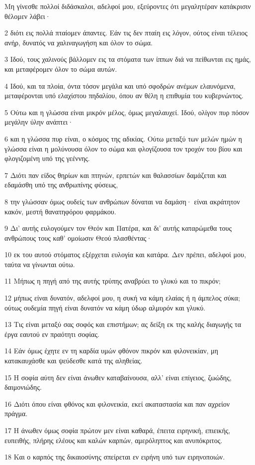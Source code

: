 \par Μη γίνεσθε πολλοί διδάσκαλοι, αδελφοί μου, εξεύροντες ότι μεγαλητέραν κατάκρισιν θέλομεν λάβει·
\par 2 διότι εις πολλά πταίομεν άπαντες. Εάν τις δεν πταίη εις λόγον, ούτος είναι τέλειος ανήρ, δυνατός να χαλιναγωγήση και όλον το σώμα.
\par 3 Ιδού, τους χαλινούς βάλλομεν εις τα στόματα των ίππων διά να πείθωνται εις ημάς, και μεταφέρομεν όλον το σώμα αυτών.
\par 4 Ιδού, και τα πλοία, όντα τόσον μεγάλα και υπό σφοδρών ανέμων ελαυνόμενα, μεταφέρονται υπό ελαχίστου πηδαλίου, όπου αν θέλη η επιθυμία του κυβερνώντος.
\par 5 Ούτω και η γλώσσα είναι μικρόν μέλος, όμως μεγαλαυχεί. Ιδού, ολίγον πυρ πόσον μεγάλην ύλην ανάπτει·
\par 6 και η γλώσσα πυρ είναι, ο κόσμος της αδικίας. Ούτω μεταξύ των μελών ημών η γλώσσα είναι η μολύνουσα όλον το σώμα και φλογίζουσα τον τροχόν του βίου και φλογιζομένη υπό της γεέννης.
\par 7 Διότι παν είδος θηρίων και πτηνών, ερπετών και θαλασσίων δαμάζεται και εδαμάσθη υπό της ανθρωπίνης φύσεως,
\par 8 την γλώσσαν όμως ουδείς των ανθρώπων δύναται να δαμάση· είναι ακράτητον κακόν, μεστή θανατηφόρου φαρμάκου.
\par 9 Δι' αυτής ευλογούμεν τον Θεόν και Πατέρα, και δι' αυτής καταρώμεθα τους ανθρώπους τους καθ' ομοίωσιν Θεού πλασθέντας·
\par 10 εκ του αυτού στόματος εξέρχεται ευλογία και κατάρα. Δεν πρέπει, αδελφοί μου, ταύτα να γίνωνται ούτω.
\par 11 Μήπως η πηγή από της αυτής τρύπης αναβρύει το γλυκύ και το πικρόν;
\par 12 μήπως είναι δυνατόν, αδελφοί μου, η συκή να κάμη ελαίας ή η άμπελος σύκα; ούτως ουδεμία πηγή είναι δυνατόν να κάμη ύδωρ αλμυρόν και γλυκύ.
\par 13 Τις είναι μεταξύ σας σοφός και επιστήμων; ας δείξη εκ της καλής διαγωγής τα έργα εαυτού εν πραότητι σοφίας.
\par 14 Εάν όμως έχητε εν τη καρδία υμών φθόνον πικρόν και φιλονεικίαν, μη κατακαυχάσθε και ψεύδεσθε κατά της αληθείας.
\par 15 Η σοφία αύτη δεν είναι άνωθεν καταβαίνουσα, αλλ' είναι επίγειος, ζωώδης, δαιμονιώδης.
\par 16 Διότι όπου είναι φθόνος και φιλονεικία, εκεί ακαταστασία και παν αχρείον πράγμα.
\par 17 Η άνωθεν όμως σοφία πρώτον μεν είναι καθαρά, έπειτα ειρηνική, επιεικής, ευπειθής, πλήρης ελέους και καλών καρπών, αμερόληπτος και ανυπόκριτος.
\par 18 Και ο καρπός της δικαιοσύνης σπείρεται εν ειρήνη υπό των ειρηνοποιών.

